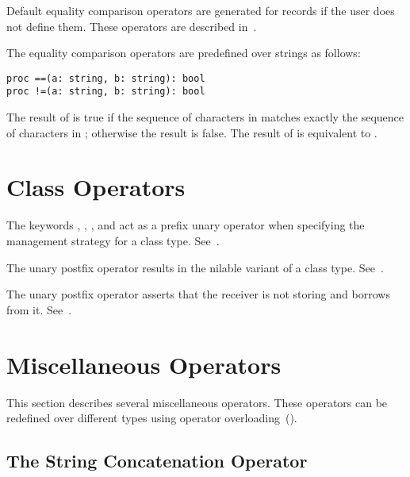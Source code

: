 Default equality comparison operators are generated for records if the
user does not define them.  These operators are described
in~.

The equality comparison operators are predefined over strings as
follows:
\begin{chapel}
\begin{verbatim}
proc ==(a: string, b: string): bool
proc !=(a: string, b: string): bool
\end{verbatim}
\end{chapel}
The result of  is true if the sequence of characters
in  matches exactly the sequence of characters in ;
otherwise the result is false.  The result of  is
equivalent to .

\section{Class Operators}
\label{Class_Operators}

The keywords , , , and
 act as a prefix unary operator when specifying the management
strategy for a class type. See~.

The unary postfix operator  results in the nilable variant of a
class type. See~.

The unary postfix operator \chpl{!} asserts that the receiver is not
storing  and borrows from it. See~.

\section{Miscellaneous Operators}
\label{Miscellaneous_Operators}

This section describes several miscellaneous operators.  These
operators can be redefined over different types using operator
overloading~().

\subsection{The String Concatenation Operator}
\label{The_String_Concatenation_Operator}

